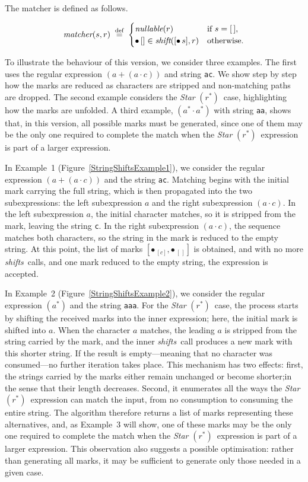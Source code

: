 \documentclass[12pt]{article}
\newcommand{\dn}{\ensuremath{\stackrel{\mbox{\scriptsize def}}{=}}}
\newcommand{\shift}{\textit{shift}}
\newcommand{\shifts}{\textit{shifts}}
\newcommand{\Marked}[1]{\bullet\,#1}
\newcommand{\nullable}{\textit{nullable}}
\newcommand{\STARText}{\textit{Star} $(r^*)$}
\newcommand{\emptylist}{[\,]}
\newcommand{\matcher}{\textit{matcher}}
\begin{document}
The matcher is defined as follows.

\[
\matcher(s, r) \; \dn\;
  \begin{cases}
    \nullable(r) & \text{if $s = \emptylist$}, \\
    \Marked{[]} \in \shift([\Marked{s}], r) & \text{otherwise.}
  \end{cases}
\]

To illustrate the behaviour of this version, we consider three examples. The first uses the
regular expression $(a + (a \cdot c))$ and string \texttt{ac}. We show step by step how the
marks are reduced as characters are stripped and non-matching paths are dropped. The second
example considers the \STARText\ case, highlighting how the marks are unfolded. A third
example, $(a^* \cdot a^*)$ with string \texttt{aa}, shows that, in this version, all possible
marks must be generated, since one of them may be the only one required to complete the match
when the \STARText\ expression is part of a larger expression.
 
In Example~1 (Figure~\ref{StringShiftsExample1}), we consider the regular expression
$(a + (a \cdot c))$ and the string \texttt{ac}. Matching begins with the initial mark carrying
the full string, which is then propagated into the two subexpressions: the left subexpression
$a$ and the right subexpression $(a \cdot c)$. In the left subexpression $a$, the initial
character matches, so it is stripped from the mark, leaving the string \texttt{c}. In the
right subexpression $(a \cdot c)$, the sequence matches both characters, so the string in the
mark is reduced to the empty string. At this point, the list of marks $[\Marked{_{[c]}},
\Marked{_{\emptylist}}]$ is obtained, and with no more \shifts\, calls, and one mark reduced to the empty string, the
expression is accepted.

In Example~2 (Figure~\ref{StringShiftsExample2}), we consider the regular expression $(a^*)$ and the
string \texttt{aaa}. For the \STARText\ case, the process starts by shifting the received marks into
the inner expression; here, the initial mark is shifted into $a$. When the character $a$ matches,
the leading $a$ is stripped from the string carried by the mark, and the inner \shifts\ call
produces a new mark with this shorter string. If the result is empty—meaning that no character was
consumed—no further iteration takes place. This mechanism has two effects: first, the strings
carried by the marks either remain unchanged or become shorter;in the sense that their length decreases.
Second, it enumerates all the ways the \STARText\ expression can match the input, from no consumption 
to consuming the entire string. The algorithm therefore returns a list of marks representing these 
alternatives, and, as Example~3 will show, one of these marks may be the only one required to complete
 the match when the \STARText\ expression is part of a larger expression. This observation also 
 suggests a possible optimisation: rather than generating all marks, it may be sufficient to 
 generate only those needed in a given case.
\end{document}

